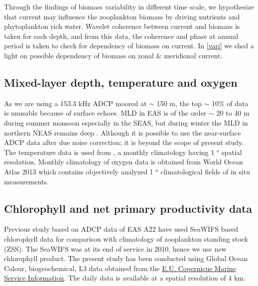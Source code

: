 \documentclass{article}
\begin{document}
	Through the findings of biomass variability in different time scale, we hypothesize that current may influence the zooplankton biomass by driving nutrients and phytoplankton rich water. Wavelet coherence between current and biomass is taken for each depth, and from this data, the coherence and phase at annual period is taken to check for dependency of biomass on current. In \autoref{vari} we shed a light on possible dependency of biomass on zonal \& meridional current.
	
	
	\subsection{Mixed-layer depth, temperature and oxygen}
	As we are using a 153.3 kHz ADCP moored at $\sim$ 150 m, the top $\sim$ 10\% of data is unusable because of surface echoes. MLD in EAS is of the order $\sim$ 20 to 40 m during summer monsoon \citep{shetye1990hydrography,sreenivas2008monthly} especially in the SEAS, but during winter the MLD in northern NEAS remains deep \citep{shankar2016inhibition}. Although it is possible to use the near-surface ADCP data after due noise correction; it is beyond the scope of present study. The temperature data is used from \citet{chatterjee2012new}, a monthly climatology having 1 $^o$ spatial resolution. Monthly climatology of oxygen data is obtained from World Ocean Atlas 2013 \citep{garcia2013oxygen} which contains objectively analyzed 1 $^o$ climatological fields of in situ measurements. 
	
	\subsection{Chlorophyll and net primary productivity data}
	Previous study based on ADCP data of EAS A22 have used SeaWIFS based chlorophyll data for comparison with climatology of zooplankton standing stock (ZSS). The SeaWIFS was at its end of service in 2010, hence we use new chlorophyll product. The present study has been conducted using Global Ocean Colour, biogeochemical, L3 data obtained from the  \href{https://doi.org/10.48670/moi-00280}{E.U. Copernicus Marine Service Information}. The daily data is available at a spatial resolution of 4 km. 
\end{document}

